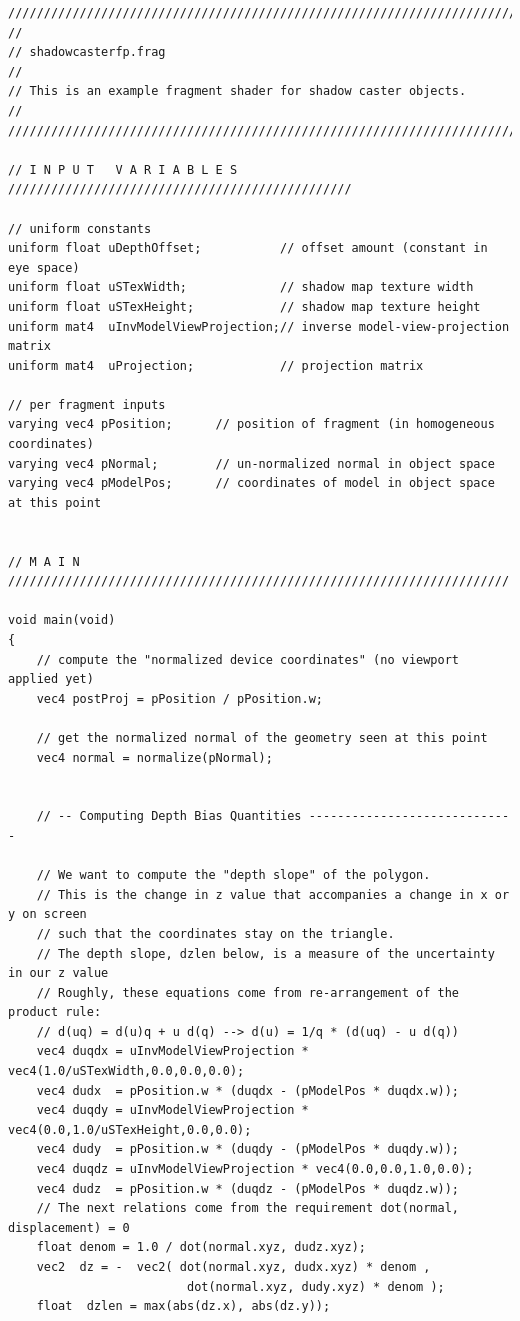 \documentclass[]{article}  %
\begin{document}
\begin{verbatim}
/////////////////////////////////////////////////////////////////////////////////
//
// shadowcasterfp.frag
//
// This is an example fragment shader for shadow caster objects.  
//
/////////////////////////////////////////////////////////////////////////////////

// I N P U T   V A R I A B L E S ////////////////////////////////////////////////

// uniform constants
uniform float uDepthOffset;           // offset amount (constant in eye space)
uniform float uSTexWidth;             // shadow map texture width
uniform float uSTexHeight;            // shadow map texture height
uniform mat4  uInvModelViewProjection;// inverse model-view-projection matrix
uniform mat4  uProjection;            // projection matrix

// per fragment inputs
varying vec4 pPosition;      // position of fragment (in homogeneous coordinates)
varying vec4 pNormal;        // un-normalized normal in object space
varying vec4 pModelPos;      // coordinates of model in object space at this point


// M A I N //////////////////////////////////////////////////////////////////////

void main(void)
{
    // compute the "normalized device coordinates" (no viewport applied yet)
    vec4 postProj = pPosition / pPosition.w;

    // get the normalized normal of the geometry seen at this point
    vec4 normal = normalize(pNormal);


    // -- Computing Depth Bias Quantities -----------------------------

    // We want to compute the "depth slope" of the polygon.  
    // This is the change in z value that accompanies a change in x or y on screen
    // such that the coordinates stay on the triangle. 
    // The depth slope, dzlen below, is a measure of the uncertainty in our z value 
    // Roughly, these equations come from re-arrangement of the product rule:
    // d(uq) = d(u)q + u d(q) --> d(u) = 1/q * (d(uq) - u d(q))
    vec4 duqdx = uInvModelViewProjection * vec4(1.0/uSTexWidth,0.0,0.0,0.0);
    vec4 dudx  = pPosition.w * (duqdx - (pModelPos * duqdx.w));
    vec4 duqdy = uInvModelViewProjection * vec4(0.0,1.0/uSTexHeight,0.0,0.0);
    vec4 dudy  = pPosition.w * (duqdy - (pModelPos * duqdy.w));
    vec4 duqdz = uInvModelViewProjection * vec4(0.0,0.0,1.0,0.0);
    vec4 dudz  = pPosition.w * (duqdz - (pModelPos * duqdz.w));
    // The next relations come from the requirement dot(normal, displacement) = 0
    float denom = 1.0 / dot(normal.xyz, dudz.xyz);
    vec2  dz = -  vec2( dot(normal.xyz, dudx.xyz) * denom , 
                         dot(normal.xyz, dudy.xyz) * denom );
    float  dzlen = max(abs(dz.x), abs(dz.y)); 



\end{verbatim}
\end{document}
